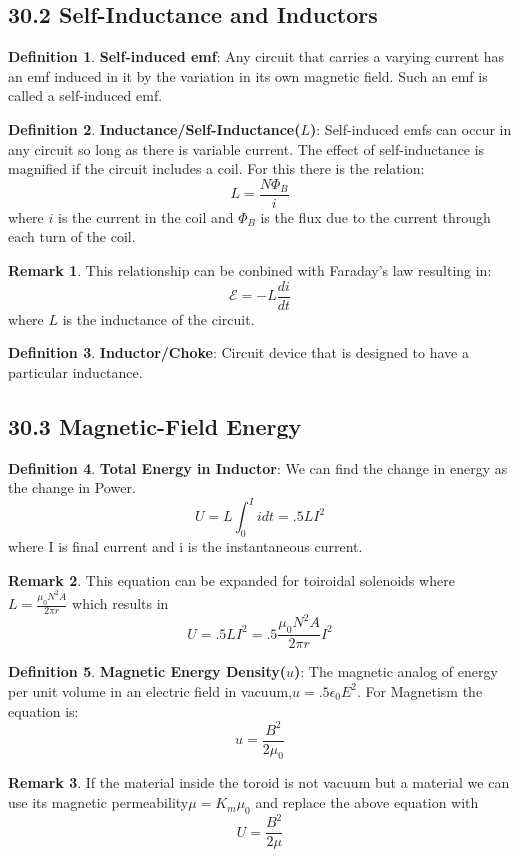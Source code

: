 \documentclass[12pt]{amsart}
\theoremstyle{definition}
\newtheorem{definition}{Definition} %
\newtheorem*{remark}{Remark}        %
\numberwithin{equation}{theorem}    %
\begin{document}
\subsection*{30.2 Self-Inductance and Inductors}

\begin{definition}
    \textbf{Self-induced emf}:
    Any circuit that carries a varying current has an emf induced in it by the variation in its own magnetic field. Such an emf is called a self-induced emf.
\end{definition}

\begin{definition}
    \textbf{Inductance/Self-Inductance($L$)}:
    Self-induced emfs can occur in any circuit so long as there is variable current. The effect of self-inductance is magnified if the circuit includes a coil. For this there is the relation:
    $$L = \frac{N\Phi_B}{i}$$ where $i$ is the current in the coil and $\Phi_B$ is the flux due to the current through each turn of the coil.
    \begin{remark}
        This relationship can be conbined with Faraday's law resulting in:
        $$\mathcal{E} = -L\frac{di}{dt}$$ where $L$ is the inductance of the circuit.
    \end{remark}
\end{definition}

\begin{definition}
    \textbf{Inductor/Choke}:
    Circuit device that is designed to have a particular inductance.
\end{definition}

\subsection*{30.3 Magnetic-Field Energy}

\begin{definition}
    \textbf{Total Energy in Inductor}:
    We can find the change in energy as the change in Power.
    $$U = L\int^I_0idt = .5LI^2$$ where I is final current and i is the instantaneous current.
    \begin{remark}
        This equation can be expanded for toiroidal solenoids where $L = \frac{\mu_0N^2A}{2\pi r}$ which results in $$U = .5LI^2 = .5\frac{\mu_0N^2A}{2\pi r}I^2$$
    \end{remark}
\end{definition}

\begin{definition}
    \textbf{Magnetic Energy Density($u$)}:
    The magnetic analog of energy per unit volume in an electric field in vacuum,$u=.5\epsilon_0E^2$. For Magnetism the equation is: 
    $$u = \frac{B^2}{2\mu_0}$$
    \begin{remark}
        If the material inside the toroid is not vacuum but a material we can use its magnetic permeability$\mu = K_m\mu_0$ and replace the above equation with $$U = \frac{B^2}{2\mu}$$
    \end{remark} 
\end{definition}
\end{document}

